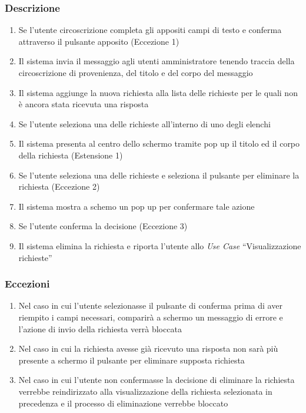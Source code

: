         \subsubsection{Descrizione}
            \begin{enumerate}
                \item Se l'utente circoscrizione completa gli appositi campi di testo e conferma attraverso il pulsante apposito (Eccezione 1)
                \item Il sistema invia il messaggio agli utenti amministratore tenendo traccia della circoscrizione di provenienza, del titolo e del corpo del messaggio
                \item Il sistema aggiunge la nuova richiesta alla lista delle richieste per le quali non è ancora stata ricevuta una risposta
                \item Se l'utente seleziona una delle richieste all'interno di uno degli elenchi
                \item Il sistema presenta al centro dello schermo tramite pop up il titolo ed il corpo della richiesta (Estensione 1)
                \item Se l'utente seleziona una delle richieste e seleziona il pulsante per eliminare la richiesta (Eccezione 2)
                \item Il sistema mostra a schemo un pop up per confermare tale azione
                \item Se l'utente conferma la decisione (Eccezione 3)
                \item Il sistema elimina la richiesta e riporta l'utente allo \textit{Use Case} ``Visualizzazione richieste''
            \end{enumerate}
        \subsubsection{Eccezioni}
            \begin{enumerate}
                \item Nel caso in cui l'utente selezionasse il pulsante di conferma prima di aver riempito i campi necessari, comparirà a schermo un messaggio di errore e l'azione di invio della richiesta verrà bloccata
                \item Nel caso in cui la richiesta avesse già ricevuto una risposta non sarà più presente a schermo il pulsante per eliminare supposta richiesta
                \item Nel caso in cui l'utente non confermasse la decisione di eliminare la richiesta verrebbe reindirizzato alla visualizzazione della richiesta selezionata in precedenza e il processo di eliminazione verrebbe bloccato
            \end{enumerate}
